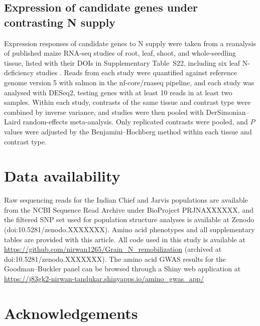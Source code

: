 \subsection{Expression of candidate genes under contrasting N supply}
Expression responses of candidate genes to N supply were taken from a reanalysis of published maize RNA-seq studies of root, leaf, shoot, and whole-seedling tissue, listed with their DOIs in Supplementary Table~S22, including six leaf N-deficiency studies \citep{Mu2017LN, Guo2022LN, Ma2021LN, TorresRodriguez2021LN, AlonsoNieves2022LN, Wang2025NRT25}. Reads from each study were quantified against reference genome version 5 with salmon in the nf-core/rnaseq pipeline, and each study was analysed with DESeq2, testing genes with at least 10 reads in at least two samples. Within each study, contrasts of the same tissue and contrast type were combined by inverse variance, and studies were then pooled with DerSimonian--Laird random-effects meta-analysis. Only replicated contrasts were pooled, and $P$ values were adjusted by the Benjamini--Hochberg method within each tissue and contrast type.

\section{Data availability}

Raw sequencing reads for the Indian Chief and Jarvis populations are available from the NCBI Sequence Read Archive under BioProject PRJNAXXXXXX, and the filtered SNP set used for population structure analyses is available at Zenodo (doi:10.5281/zenodo.XXXXXXX). Amino acid phenotypes and all supplementary tables are provided with this article. All code used in this study is available at \url{https://github.com/nirwan1265/Grain_N_remobilization} (archived at doi:10.5281/zenodo.XXXXXXX). The amino acid GWAS results for the Goodman--Buckler panel can be browsed through a Shiny web application at \url{https://j83gk2-nirwan-tandukar.shinyapps.io/amino_gwas_app/}



\section{Acknowledgements}

